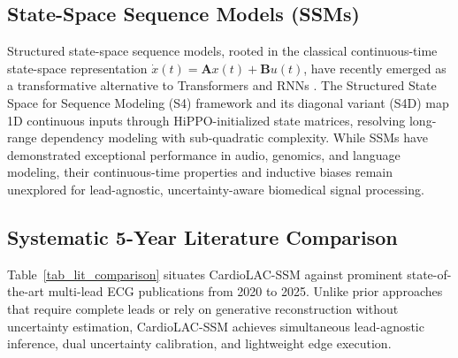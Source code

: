 \documentclass[journal]{IEEEtran}
\begin{document}
\subsection{State-Space Sequence Models (SSMs)}
Structured state-space sequence models, rooted in the classical continuous-time state-space representation $\dot{x}(t) = \mathbf{A} x(t) + \mathbf{B} u(t)$, have recently emerged as a transformative alternative to Transformers and RNNs \cite{ref_29}. The Structured State Space for Sequence Modeling (S4) framework \cite{ref_30} and its diagonal variant (S4D) \cite{ref_31} map 1D continuous inputs through HiPPO-initialized state matrices, resolving long-range dependency modeling with sub-quadratic complexity. While SSMs have demonstrated exceptional performance in audio, genomics, and language modeling, their continuous-time properties and inductive biases remain unexplored for lead-agnostic, uncertainty-aware biomedical signal processing.

\subsection{Systematic 5-Year Literature Comparison}
Table~\ref{tab_lit_comparison} situates CardioLAC-SSM against prominent state-of-the-art multi-lead ECG publications from 2020 to 2025. Unlike prior approaches that require complete leads or rely on generative reconstruction without uncertainty estimation, CardioLAC-SSM achieves simultaneous lead-agnostic inference, dual uncertainty calibration, and lightweight edge execution.
\end{document}
